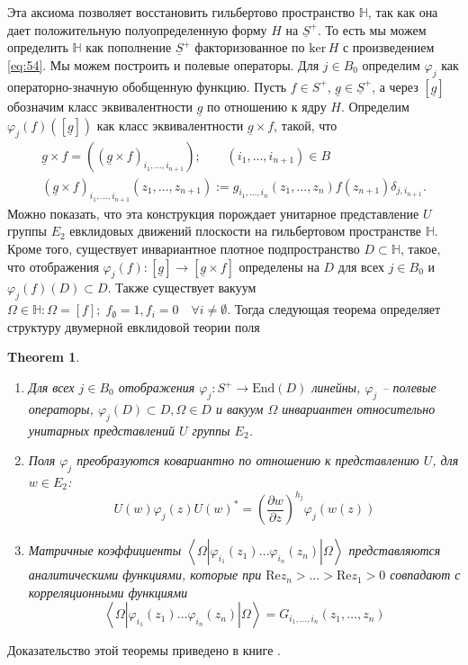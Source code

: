 \documentclass[12pt]{article}
\newtheorem{theorem}{Theorem}
\begin{document}
Эта аксиома позволяет восстановить гильбертово пространство $\mathbb{H}$, так как она дает
положительную полуопределенную форму $H$ на $\underline{S}^{+}$. То есть мы можем определить
$\mathbb{H}$ как пополнение $\underline{S}^{+}$ факторизованное по $\mathrm{ker}\, H$ с
произведением \eqref{eq:54}. Мы можем построить и полевые операторы. Для $j\in B_{0}$ определим
$\varphi_{j}$ как операторно-значную обобщенную функцию. Пусть $f\in S^{+}$,
$\underline{g}\in\underline{S}^{+}$, а через $[\underline{g}]$ обозначим класс эквивалентности
$\underline{g}$ по отношению к ядру $H$. Определим $\varphi_{j}(f)([\underline{g}])$ как класс
эквивалентности $\underline{g}\times f$, такой, что
\begin{equation}
  \label{eq:55}
  \begin{array}{l}
    \underline{g}\times f=((\underline{g}\times f)_{i_{1},\dots,i_{n+1}});\quad\quad (i_{1},\dots,i_{n+1})\in B\\
    (\underline{g}\times f)_{i_{1},\dots,i_{n+1}}(z_{1},\dots,z_{n+1}):=g_{i_{1},\dots,i_{n}}(z_{1},\dots,z_{n})f(z_{n+1})\delta_{j,i_{n+1}}.
  \end{array}
\end{equation}
Можно показать, что эта конструкция порождает унитарное представление $U$ группы $E_{2}$ евклидовых
движений плоскости на гильбертовом пространстве $\mathbb{H}$. Кроме того, существует инвариантное
плотное подпространство $D\subset \mathbb{H}$, такое, что отображения
$\varphi_{j}(f):[\underline{g}]\to [\underline{g}\times f]$ определены на $D$ для всех $j\in B_{0}$
и $\varphi_{j}(f)(D)\subset D$. Также существует вакуум $\Omega\in\mathbb{H}: \Omega=[f];\;
f_{\emptyset}=1, f_{i}=0\quad \forall i\neq \emptyset$. Тогда следующая теорема определяет структуру
двумерной евклидовой теории поля
\begin{theorem}
  \begin{enumerate}
  \item Для всех $j\in B_{0}$ отображения $\varphi_{j}:S^{+}\to \mathrm{End}(D)$ линейны, $\varphi_{j}$ -- полевые операторы, $\varphi_{j}(D)\subset D, \Omega\in D$ и вакуум $\Omega$ инвариантен относительно унитарных представлений $U$ группы $E_{2}$.
  \item Поля $\varphi_{j}$ преобразуются ковариантно по отношению к представлению $U$, для $w\in E_{2}$:
    \begin{equation}
      \label{eq:57}
      U(w)\varphi_{j}(z)U(w)^{*}=\left(\frac{\partial w}{\partial z}\right)^{h_{j}}\varphi_{j}(w(z))
    \end{equation}
  \item Матричные коэффициенты $\left<\Omega|\varphi_{i_{1}}(z_{1})\dots \varphi_{i_{n}}(z_{n})|\Omega\right>$ представляются аналитическими функциями, которые при $\mathrm{Re}z_{n}>\dots>\mathrm{Re}z_{1}>0$ совпадают с корреляционными функциями
  \begin{equation}
    \label{eq:56}
    \left<\Omega|\varphi_{i_{1}}(z_{1})\dots \varphi_{i_{n}}(z_{n})|\Omega\right>=G_{i_{1},\dots,i_{n}}(z_{1},\dots,z_{n})
  \end{equation}
  \end{enumerate}
\end{theorem}
Доказательство этой теоремы приведено в книге \cite{schottenloher2008mathematical}.
\end{document}
